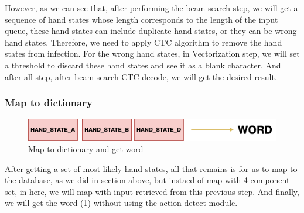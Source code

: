 However, as we can see that, after performing the beam search step, we will get a sequence of hand states whose length corresponds to the length of the input queue, these hand states can include duplicate hand states, or they can be wrong hand states. Therefore, we need to apply CTC algorithm to remove the hand states from infection. For the wrong hand states, in Vectorization step, we will set a threshold to discard these hand states and see it as a blank character. And after all step, after beam search CTC decode, we will get the desired result.



      
      
    \subsubsection{ Map to dictionary }

      \begin{figure}[H]
        \centering
        \includegraphics[width=\textwidth]{img/Chap4/Result.png}
        \caption{ Map to dictionary and get word }
        \label{fig:Chap4-Result}
      \end{figure}

      After getting a set of most likely hand states, all that remains is for us to map to the database, as we did in section above, but instaed of map with 4-component set, in here, we will map with input retrieved from this previous step. And finally, we will get the word (\ref{fig:Chap4-Result}) without using the action detect module.



